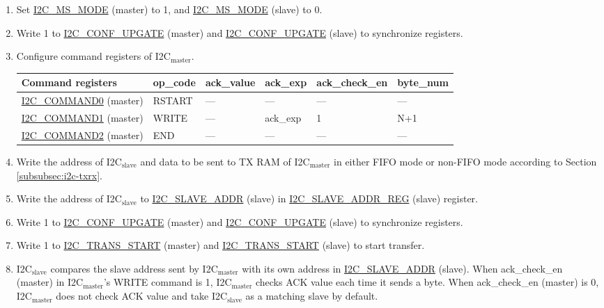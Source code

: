 \documentclass[main\_\_EN.tex]{subfiles}
\begin{document}
\begin{enumerate}
\item Set \hyperref[fielddesc:I2CMSMODE]{I2C\_MS\_MODE} (master) to 1, and \hyperref[fielddesc:I2CMSMODE]{I2C\_MS\_MODE} (slave) to 0.
\item Write 1 to \hyperref[fielddesc:I2CCONFUPGATE]{I2C\_CONF\_UPGATE} (master) and \hyperref[fielddesc:I2CCONFUPGATE]{I2C\_CONF\_UPGATE} (slave) to synchronize registers.
\item Configure command registers of I2C$_\text{master}$.
\begin{longtable}{ | p{5cm} | p{1.5cm} | p{1.5cm} | p{1.5cm} |p{2.5cm} | p{1.5cm} |}
\hline\rowcolor{lightgray}
Command registers& op\_code & ack\_value&ack\_exp&ack\_check\_en&byte\_num  \\ \hline
\hyperref[fielddesc:I2CCOMMAND0]{I2C\_COMMAND0} (master)& RSTART& ---&---&---&---  \\ \hline
\hyperref[fielddesc:I2CCOMMAND1]{I2C\_COMMAND1} (master)& WRITE& ---&ack\_exp&1&N+1  \\ \hline
\hyperref[fielddesc:I2CCOMMAND2]{I2C\_COMMAND2} (master)& END& ---&---&---&---  \\ \hline
\end{longtable}
\item Write the address of I2C$_\text{slave}$ and data to be sent to TX RAM of I2C$_\text{master}$ in either FIFO mode or non-FIFO mode according to Section \ref{subsubsec:i2c-txrx}.
\item Write the address of I2C$_\text{slave}$ to \hyperref[fielddesc:I2CSLAVEADDR]{I2C\_SLAVE\_ADDR} (slave) in \hyperref[regdesc:I2CSLAVEADDRREG]{I2C\_SLAVE\_ADDR\_REG} (slave) register.
\item Write 1 to \hyperref[fielddesc:I2CCONFUPGATE]{I2C\_CONF\_UPGATE} (master) and \hyperref[fielddesc:I2CCONFUPGATE]{I2C\_CONF\_UPGATE} (slave) to synchronize registers.
\item Write 1 to \hyperref[fielddesc:I2CTRANSSTART]{I2C\_TRANS\_START} (master) and \hyperref[fielddesc:I2CTRANSSTART]{I2C\_TRANS\_START} (slave) to start transfer.
\item I2C$_\text{slave}$ compares the slave address sent by I2C$_\text{master}$ with its own address in \hyperref[fielddesc:I2CSLAVEADDR]{I2C\_SLAVE\_ADDR} (slave). When ack\_check\_en (master) in I2C$_\text{master}$'s WRITE command is 1, I2C$_\text{master}$ checks ACK value each time it sends a byte. When ack\_check\_en (master) is 0, I2C$_\text{master}$ does not check ACK value and take I2C$_\text{slave}$ as a matching slave by default.

\end{enumerate}
\end{document}
